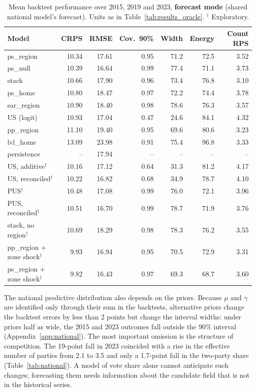\documentclass[preprint,12pt,authoryear]{elsarticle}
\begin{document}
\begin{table}[ht]
\centering
\caption{Mean backtest performance over 2015, 2019 and 2023, \textbf{forecast mode} (shared national model's forecast). Units as in Table~\ref{tab:results_oracle}. $^\dagger$ Exploratory.}
\label{tab:results_forecast}
\small
\setlength{\tabcolsep}{3pt}
\begin{tabular}{lrrrrrr}
\toprule
Model & CRPS & RMSE & Cov.\ 90\% & Width & Energy & Count RPS \\
\midrule
ps\_region & 10.34 & 17.61 & 0.95 & 71.2 & 72.5 & 3.52 \\
ps\_null & 10.39 & 16.64 & 0.99 & 77.4 & 71.1 & 3.73 \\
stack & 10.66 & 17.90 & 0.96 & 73.4 & 76.8 & 3.10 \\
ps\_home & 10.80 & 18.47 & 0.97 & 72.2 & 74.4 & 3.78 \\
sar\_region & 10.90 & 18.40 & 0.98 & 78.6 & 76.3 & 3.57 \\
US (logit) & 10.93 & 17.04 & 0.47 & 24.6 & 84.1 & 4.32 \\
pp\_region & 11.10 & 19.40 & 0.95 & 69.6 & 80.6 & 3.23 \\
lvl\_home & 13.09 & 23.98 & 0.91 & 75.4 & 96.8 & 3.33 \\
persistence & -- & 17.94 & -- & -- & -- & -- \\
\midrule
US, additive$^\dagger$ & 10.16 & 17.12 & 0.64 & 31.3 & 81.2 & 4.17 \\
US, reconciled$^\dagger$ & 10.22 & 16.82 & 0.68 & 34.9 & 78.7 & 4.10 \\
PUS$^\dagger$ & 10.48 & 17.08 & 0.99 & 76.0 & 72.1 & 3.96 \\
PUS, reconciled$^\dagger$ & 10.51 & 16.70 & 0.99 & 78.7 & 71.9 & 3.76 \\
stack, no region$^\dagger$ & 10.69 & 18.29 & 0.98 & 78.3 & 76.2 & 3.55 \\
pp\_region + zone shock$^\dagger$ & 9.93 & 16.94 & 0.95 & 70.5 & 72.9 & 3.31 \\
ps\_region + zone shock$^\dagger$ & 9.82 & 16.43 & 0.97 & 69.3 & 68.7 & 3.60 \\
\bottomrule
\end{tabular}
\end{table}

The national predictive distribution also depends on the priors. Because $\mu$ and $\gamma$ are identified only through their sum in the backtests, alternative priors change the backtest errors by less than 2 points but change the interval widths: under priors half as wide, the 2015 and 2023 outcomes fall outside the 90\% interval (Appendix~\ref{app:national}). The most important omission is the structure of competition. The 19-point fall in 2023 coincided with a rise in the effective number of parties from 2.1 to 3.5 and only a 1.7-point fall in the two-party share (Table~\ref{tab:national}). A model of vote share alone cannot anticipate such changes; forecasting them needs information about the candidate field that is not in the historical series.
\end{document}
